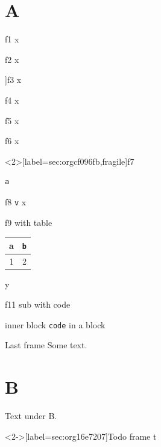 \documentclass[presentation]{beamer}
\author{root}
\date{\today}
\title{}
\begin{document}
\section{A}
\label{sec:orgbeb7675}
\begin{frame}[label={sec:org93f5158},t]{f1}
x
\end{frame}
\begin{frame}[allowframebreaks]{f2}
x
\end{frame}
\begin{frame}[label={sec:org17150d8},t]]{f3}
x
\end{frame}
\begin{frame}[label={sec:org33d643e},fragile]{f4}
x
\end{frame}
\begin{frame}[label=foo,t]{f5}
x
\end{frame}
\begin{frame}[<+->][label={sec:org65667e6},plain,allowframebreaks=0.8]{f6}
x
\end{frame}
\begin{frame}<2>[label={sec:orgcf096fb},fragile]{f7}
 \begin{verbatim}
a
\end{verbatim}
\end{frame}
\begin{frame}[label={sec:orgdff9bf0},fragile]{f8 \texttt{v}}
 x
\end{frame}

\begin{frame}[label={sec:org2855300},fragile]{f9 with table}
 \begin{center}
\begin{tabular}{rr}
a & \texttt{b}\\[0pt]
\hline
1 & 2\\[0pt]
\end{tabular}
\end{center}
\end{frame}
\begin{frame}[label={sec:org35baab5},t]{}
y
\end{frame}
\begin{frame}[label={sec:orge88a2ea},fragile]{f11 sub with code}
 \begin{block}{inner block}
\texttt{code} in a block
\end{block}
\end{frame}
\begin{frame}[label={sec:orgc9f13f3}]{Last frame}
Some text.
\end{frame}

\section{B}
\label{sec:orgcf9ac82}
Text under B.

\begin{frame}<2->[label={sec:org16e7207}]{Todo frame}
t
\end{frame}
\end{document}
